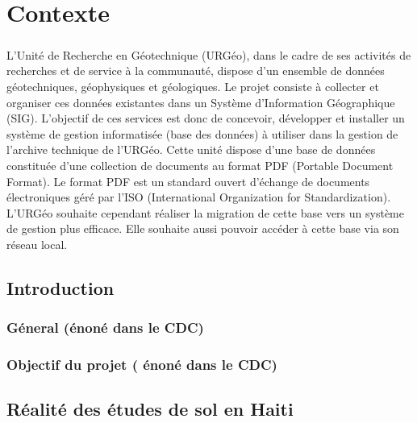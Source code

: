 \chapter{Contexte}
\paragraph{}
L’Unité de Recherche en Géotechnique (URGéo), dans le cadre de ses activités de recherches et de service à la communauté, dispose d’un ensemble de données géotechniques, géophysiques et géologiques. Le projet consiste à collecter et organiser ces données existantes dans un Système d’Information Géographique (SIG). L’objectif de ces services est donc de concevoir, développer et installer un système de gestion informatisée (base des données) à utiliser dans la gestion de l’archive technique de l’URGéo. Cette unité dispose d'une base de données constituée d’une collection de documents au format PDF (Portable Document Format). Le format PDF est un standard ouvert d'échange de documents électroniques géré par l’ISO (International Organization for Standardization). L’URGéo  souhaite cependant réaliser la migration de cette base vers un système de gestion plus efficace. Elle souhaite aussi pouvoir accéder à cette base via son réseau local.
    \section{Introduction}
        \subsection{Géneral (énoné dans le CDC)}
        \lipsum[1]
        \subsection{Objectif du projet ( énoné dans le CDC)}
        \lipsum[1]
    \section{Réalité des études de sol en Haiti}

